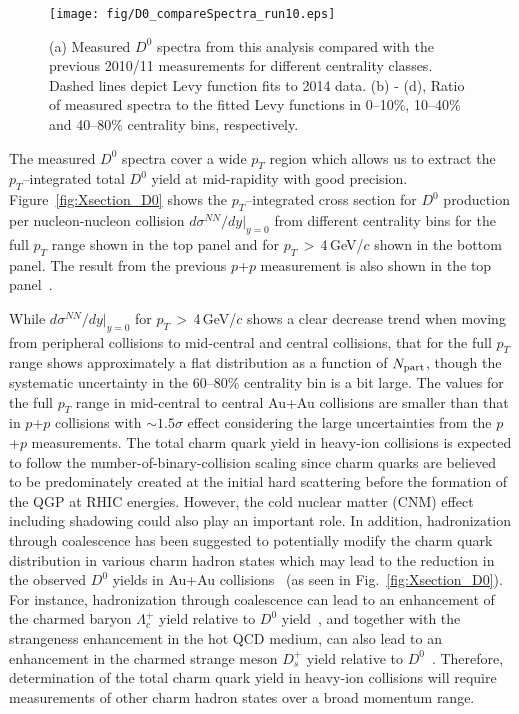 \documentclass[%
 reprint,	
 amsmath,amssymb,
 aps,
 prc,
]{revtex4-1}
\begin{document}
\begin{figure}
\centering
\texttt{[image: fig/D0\_compareSpectra\_run10.eps]}
  \caption{(a) Measured $D^{0}$ spectra from this analysis compared with the previous 2010/11 measurements for different centrality classes. Dashed lines depict Levy function fits to 2014 data. (b) - (d), Ratio of measured spectra to the fitted Levy functions in 0--10\%, 10--40\% and 40--80\% centrality bins, respectively.}
\label{fig:D0_compareSpectra_run10} 
\end{figure}


The measured $D^0$ spectra cover a wide $p_{T}$ region which allows us to extract the $p_{T}$--integrated total $D^0$ yield at mid-rapidity with good precision. Figure~\ref{fig:Xsection_D0} shows the $p_{T}$--integrated cross section for $D^0$ production per nucleon-nucleon collision $d\sigma^{NN}/dy|_{y=0}$ from different centrality bins for the full $p_{T}$ range shown in the top panel and for $p_{T}$\,$>$\,4\,GeV/$c$ shown in the bottom panel. The result from the previous $p$+$p$ measurement is also shown in the top panel~\cite{Star_D_pp}.

While $d\sigma^{NN}/dy|_{y=0}$ for $p_{T}$\,$>$\,4\,GeV/$c$ shows a clear decrease trend when moving from peripheral collisions to mid-central and central collisions, that for the full $p_T$ range shows approximately a flat distribution as a function of $N_{\rm part}$, though the systematic uncertainty in the 60--80\% centrality bin is a bit large. The values for the full $p_T$ range in mid-central to central Au+Au collisions are smaller than that in $p$+$p$ collisions with $\sim1.5\sigma$ effect considering the large uncertainties from the $p$+$p$ measurements. The total charm quark yield in heavy-ion collisions is expected to follow the number-of-binary-collision scaling since charm quarks are believed to be predominately created at the initial hard scattering before the formation of the QGP at RHIC energies. However, the cold nuclear matter (CNM) effect including shadowing could also play an important role. In addition, hadronization through coalescence has been suggested to potentially modify the charm quark distribution in various charm hadron states which may lead to the reduction in the observed $D^0$ yields in Au+Au collisions~\cite{GRECO2004202} (as seen in Fig.~\ref{fig:Xsection_D0}). For instance, hadronization through coalescence can lead to an enhancement of the charmed baryon $\Lambda_{c}^+$ yield relative to $D^0$ yield~\cite{Oh2009,Zhao:2018jlw,Plumari:2017ntm}, and together with the strangeness enhancement in the hot QCD medium, can also lead to an enhancement in the charmed strange meson $D_{s}^+$ yield relative to $D^0$~\cite{He2013,Zhao:2018jlw,Plumari:2017ntm}. Therefore, determination of the total charm quark yield in heavy-ion collisions will require measurements of other charm hadron states over a broad momentum range. 
\end{document}
